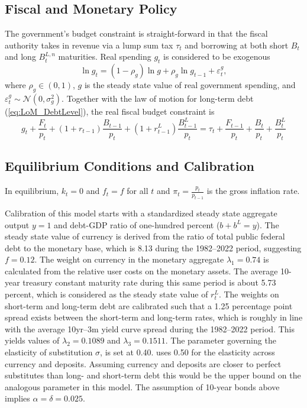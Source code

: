 \documentclass[11pt,a4paper,margin=1.5in]{article}
\begin{document}
\subsection{Fiscal and Monetary Policy}

The government's budget constraint is straight-forward in that the fiscal authority takes in revenue via a lump sum tax $\tau_t$ and borrowing at both short $B_t$ and long $B^{L,n}_t$ maturities. 
Real spending $g_t$ is considered to be exogenous
\begin{equation}
\label{eq:GovSpending}
	\ln g_t = (1-\rho_g)\ln g + \rho_g\ln g_{t-1} + \varepsilon^g_t,
\end{equation}
where $\rho_g \in (0,1)$, $g$ is the steady state value of real government spending, and $\varepsilon^g_t \sim \mathcal{N}(0,\sigma_g^2)$. 
Together with the law of motion for long-term debt (\ref{eq:LoM_DebtLevel}), the real fiscal budget constraint is
\begin{equation}
\label{eq:FiscalBudget}
	g_t + \frac{F_t}{p_t} + (1+r_{t-1})\frac{B_{t-1}}{p_t} + (1+r^L_{t-1})\frac{B^L_{t-1}}{p_t} = \tau_t + \frac{F_{t-1}}{p_t}+\frac{B_t}{p_t} + \frac{B^L_t}{p_t}
\end{equation}

\subsection{Equilibrium Conditions and Calibration}

In equilibrium, $k_t = 0$ and $f_t = f$ for all $t$ and $\pi_t = \frac{p_t}{p_{t-1}}$ is the gross inflation rate.

Calibration of this model starts with a standardized steady state aggregate output $y = 1$ and debt-GDP ratio of one-hundred percent ($b + b^L = y$). 
The steady state value of currency is derived from the ratio of total public federal debt to the monetary base, which is 8.13 during the 1982--2022 period, suggesting $f = 0.12$.
The weight on currency in the monetary aggregate $\lambda_1 = 0.74$ is calculated from the relative user costs on the monetary assets. 
The average 10-year treasury constant maturity rate during this same period is about 5.73 percent, which is considered as the steady state value of $r^L_t$. 
The weights on short-term and long-term debt are calibrated such that a 1.25 percentage point spread exists between the short-term and long-term rates, which is roughly in line with the average 10yr--3m yield curve spread during the 1982--2022 period. 
This yields values of $\lambda_2 = 0.1089$ and $\lambda_3 = 0.1511$. 
The parameter governing the elasticity of substitution $\sigma$, is set at 0.40. 
\citet{Belongia-Ireland:2014} uses 0.50 for the elasticity across currency and deposits. 
Assuming currency and deposits are closer to perfect substitutes than long- and short-term debt this would be the upper bound on the analogous parameter in this model.
The assumption of 10-year bonds above implies $\alpha = \delta = 0.025$.
\end{document}
